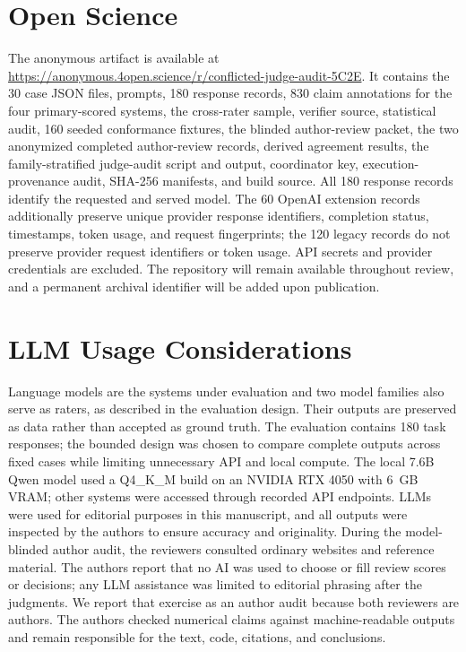 \documentclass[conference]{IEEEtran}
\begin{document}
\section*{Open Science}
The anonymous artifact is available at
\url{https://anonymous.4open.science/r/conflicted-judge-audit-5C2E}. It contains the 30 case JSON files, prompts, 180 response
records, 830 claim annotations for the four primary-scored systems, the
cross-rater sample, verifier source, statistical audit, 160 seeded conformance
fixtures, the blinded author-review packet, the two anonymized completed
author-review records, derived
agreement results, the family-stratified judge-audit script and output,
coordinator key, execution-provenance audit, SHA-256
manifests, and build source.
All 180 response records identify the requested and served model. The 60 OpenAI
extension records additionally preserve unique provider response identifiers,
completion status, timestamps, token usage, and request fingerprints; the 120
legacy records do not preserve provider request identifiers or token usage. API
secrets and provider credentials are excluded. The repository will remain
available throughout review, and a permanent archival identifier will be added
upon publication.

\section*{LLM Usage Considerations}
Language models are the systems under evaluation and two model families also
serve as raters, as described in the evaluation design. Their outputs are
preserved as data rather than accepted as ground truth. The evaluation contains
180 task responses; the bounded design was chosen to compare complete outputs
across fixed cases while limiting unnecessary API and local compute. The local
7.6B Qwen model used a Q4\_K\_M build on an NVIDIA RTX 4050 with 6~GB VRAM; other
systems were accessed through recorded API endpoints. LLMs were used for
editorial purposes in this manuscript, and all outputs were inspected by the
authors to ensure accuracy and originality. During the model-blinded author
audit, the reviewers consulted ordinary websites and reference material. The
authors report that no AI was used to choose or fill review scores or decisions;
any LLM assistance was limited to editorial phrasing after the judgments. We report that exercise
as an author audit because both reviewers are authors. The authors checked
numerical claims against machine-readable outputs and remain responsible for
the text, code, citations, and conclusions.
\end{document}
